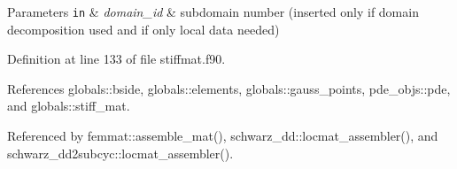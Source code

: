 \begin{DoxyParams}[1]{Parameters}
\mbox{\tt in}  & {\em domain\+\_\+id} & subdomain number (inserted only if domain decomposition used and if only local data needed) \\
\hline
\end{DoxyParams}


Definition at line 133 of file stiffmat.\+f90.



References globals\+::bside, globals\+::elements, globals\+::gauss\+\_\+points, pde\+\_\+objs\+::pde, and globals\+::stiff\+\_\+mat.



Referenced by femmat\+::assemble\+\_\+mat(), schwarz\+\_\+dd\+::locmat\+\_\+assembler(), and schwarz\+\_\+dd2subcyc\+::locmat\+\_\+assembler().


